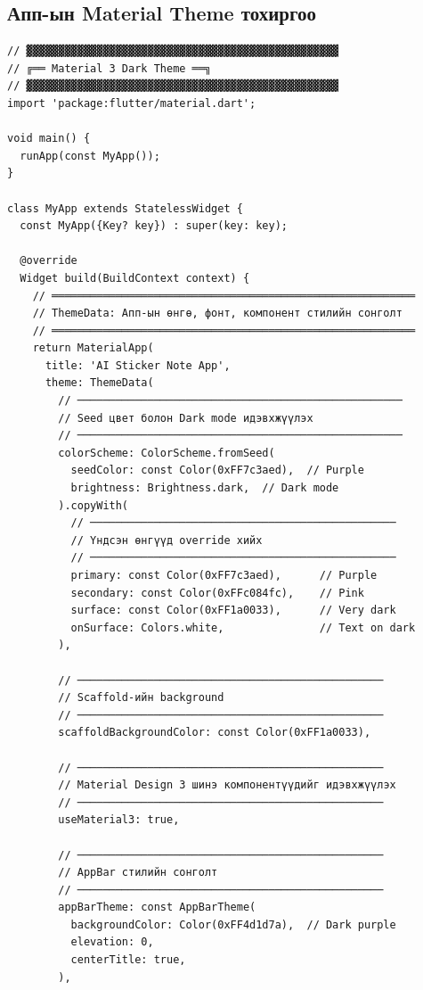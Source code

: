 \subsection{Апп-ын Material Theme тохиргоо}

\begin{lstlisting}[caption={main.dart -- ThemeData дэлгэрэнгүй}]
// ▓▓▓▓▓▓▓▓▓▓▓▓▓▓▓▓▓▓▓▓▓▓▓▓▓▓▓▓▓▓▓▓▓▓▓▓▓▓▓▓▓▓▓▓▓▓▓▓▓
// ╔══ Material 3 Dark Theme ══╗
// ▓▓▓▓▓▓▓▓▓▓▓▓▓▓▓▓▓▓▓▓▓▓▓▓▓▓▓▓▓▓▓▓▓▓▓▓▓▓▓▓▓▓▓▓▓▓▓▓▓
import 'package:flutter/material.dart';

void main() {
  runApp(const MyApp());
}

class MyApp extends StatelessWidget {
  const MyApp({Key? key}) : super(key: key);

  @override
  Widget build(BuildContext context) {
    // ═════════════════════════════════════════════════════════
    // ThemeData: Апп-ын өнгө, фонт, компонент стилийн сонголт
    // ═════════════════════════════════════════════════════════
    return MaterialApp(
      title: 'AI Sticker Note App',
      theme: ThemeData(
        // ───────────────────────────────────────────────────
        // Seed цвет болон Dark mode идэвхжүүлэх
        // ───────────────────────────────────────────────────
        colorScheme: ColorScheme.fromSeed(
          seedColor: const Color(0xFF7c3aed),  // Purple
          brightness: Brightness.dark,  // Dark mode
        ).copyWith(
          // ────────────────────────────────────────────────
          // Үндсэн өнгүүд override хийх
          // ────────────────────────────────────────────────
          primary: const Color(0xFF7c3aed),      // Purple
          secondary: const Color(0xFFc084fc),    // Pink
          surface: const Color(0xFF1a0033),      // Very dark
          onSurface: Colors.white,               // Text on dark
        ),
        
        // ────────────────────────────────────────────────
        // Scaffold-ийн background
        // ────────────────────────────────────────────────
        scaffoldBackgroundColor: const Color(0xFF1a0033),
        
        // ────────────────────────────────────────────────
        // Material Design 3 шинэ компонентүүдийг идэвхжүүлэх
        // ────────────────────────────────────────────────
        useMaterial3: true,
        
        // ────────────────────────────────────────────────
        // AppBar стилийн сонголт
        // ────────────────────────────────────────────────
        appBarTheme: const AppBarTheme(
          backgroundColor: Color(0xFF4d1d7a),  // Dark purple
          elevation: 0,
          centerTitle: true,
        ),
        

\end{lstlisting}
